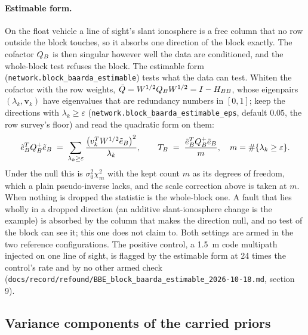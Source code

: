 \documentclass[main.tex]{subfiles}
\begin{document}
\paragraph{Estimable form.}
On the float vehicle a line of sight's slant ionosphere is a free column that
no row outside the block touches, so it absorbs one direction of the block
exactly.  The cofactor $Q_B$ is then singular however well the data are
conditioned, and the whole-block test refuses the block.  The estimable form
(\texttt{network.block\_baarda\_estimable}) tests what the data can test.
Whiten the cofactor with the row weights,
$\tilde{Q}=W^{1/2}Q_BW^{1/2}=I-H_{BB}$, whose
eigenpairs $(\lambda_k,\bm v_k)$ have eigenvalues that are redundancy numbers
in $[0,1]$; keep the directions with $\lambda_k\ge\varepsilon$
(\texttt{network.block\_baarda\_estimable\_eps}, default $0.05$, the row
survey's floor) and read the quadratic form on them:
\begin{equation}
\tilde{e}_B^{T}Q_B^{+}\tilde{e}_B
 \;=\; \sum_{\lambda_k\ge\varepsilon}
   \frac{\bigl(v_k^{T}W^{1/2}\tilde{e}_B\bigr)^2}{\lambda_k},
\qquad
T_B \;=\; \frac{\tilde{e}_B^{T}Q_B^{+}\tilde{e}_B}{m},
\quad m=\#\{\lambda_k\ge\varepsilon\}.
\label{eq:qc-block-estimable}
\end{equation}
Under the null this is $\sigma_0^2\chi^2_m$ with the kept count $m$ as its
degrees of freedom, which a plain pseudo-inverse lacks, and the scale
correction above is taken at $m$.  When nothing is dropped the statistic is the
whole-block one.  A fault that lies wholly in a dropped direction (an additive
slant-ionosphere change is the example) is absorbed by the column that makes
the direction null, and no test of the block can see it; this one does not
claim to.  Both settings are armed in the two reference configurations.  The
positive control, a 1.5~m code multipath injected on one line of sight, is
flagged by the estimable form at 24 times the control's rate and by no other
armed check
(\texttt{docs/record/refound/BBE\_block\_baarda\_estimable\_2026-10-18.md}, section 9).

\subsection{Variance components of the carried priors}\label{sec:stoch-carry-vce}
\end{document}
